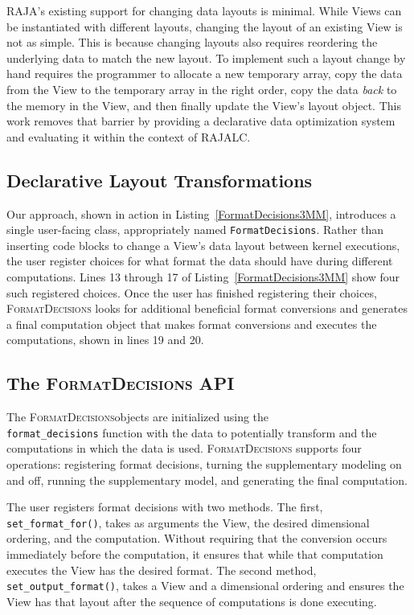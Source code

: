 \documentclass[sigconf,review=true]{acmart}
\newcommand{\FormatDecisions}[0]{{\textsc{FormatDecisions}}}
\begin{document}
RAJA's existing support for changing data layouts is minimal. 
While Views can be instantiated with different layouts, changing the layout of an existing View is not as simple.
This is because changing layouts also requires reordering the underlying data to match the new layout. 
To implement such a layout change by hand requires the programmer to allocate a new temporary array, 
copy the data from the View to the temporary array in the right order, 
copy the data \textit{back} to the memory in the View, 
and then finally update the View's layout object.
This work removes that barrier by providing a declarative data optimization system and evaluating
it within the context of RAJALC.


\subsection{Declarative Layout Transformations}
Our approach, shown in action in Listing~\ref{FormatDecisions3MM}, introduces a single user-facing class, appropriately named \verb.FormatDecisions..
Rather than inserting code blocks to change a View's data layout between kernel executions, the user register choices for what format the data should have during different computations. Lines 13 through 17 of Listing~\ref{FormatDecisions3MM} show four such registered choices.
Once the user has finished registering their choices, \FormatDecisions{} looks for additional beneficial format conversions and generates a final computation object that makes format conversions and executes the computations, shown in lines 19 and 20.

\subsection{The \FormatDecisions{} API}
The \FormatDecisions objects are initialized using the \\
 \verb.format_decisions. function with the data to potentially transform and the computations in which the data is used.
\FormatDecisions{} supports four operations: registering format decisions, turning the supplementary modeling on and off, running the supplementary model, and generating the final computation.

The user registers format decisions with two methods.
The first, \verb.set_format_for()., takes as arguments the View, the desired dimensional ordering, and the computation.
Without requiring that the conversion occurs immediately before the computation, it ensures that while that computation executes the View has the desired format.
The second method, \verb.set_output_format()., takes a View and a dimensional ordering and ensures the View has that layout after the sequence of computations is done executing.
\end{document}
